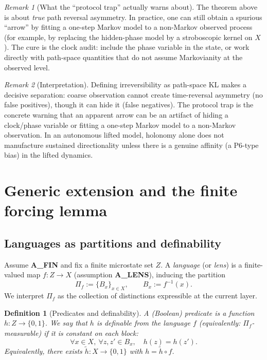 \documentclass[11pt]{article}
\newtheorem{definition}{Definition}
\theoremstyle{remark}
\newtheorem{remark}{Remark}
\begin{document}
\begin{remark}[What the ``protocol trap'' actually warns about]
The theorem above is about \emph{true} path reversal asymmetry.
In practice, one can still obtain a spurious ``arrow'' by fitting a one-step Markov model to a non-Markov observed process (for example, by replacing the hidden-phase model by a stroboscopic kernel on $X$).
The cure is the clock audit: include the phase variable in the state, or work directly with path-space quantities that do not assume Markovianity at the observed level.
\end{remark}

\begin{remark}[Interpretation]
Defining irreversibility as path-space KL makes a decisive separation: coarse observation cannot create time-reversal asymmetry (no false positives), though it can hide it (false negatives).
The protocol trap is the concrete warning that an apparent arrow can be an artifact of hiding a clock/phase variable or fitting a one-step Markov model to a non-Markov observation.
In an autonomous lifted model, holonomy alone does not manufacture sustained directionality unless there is a genuine affinity (a P6-type bias) in the lifted dynamics.
\end{remark}

\section{Generic extension and the finite forcing lemma}\label{sec:forcing}
\subsection{Languages as partitions and definability}

Assume \textbf{A\_FIN} and fix a finite microstate set $Z$.
A \emph{language} (or \emph{lens}) is a finite-valued map $f:Z\to X$ (assumption \textbf{A\_LENS}), inducing the partition
\[
\Pi_f := \{B_x\}_{x\in X}, \qquad B_x := f^{-1}(x).
\]
We interpret $\Pi_f$ as the collection of distinctions expressible at the current layer.

\begin{definition}[Predicates and definability]
A (Boolean) \emph{predicate} is a function $h:Z\to\{0,1\}$.
We say that $h$ is \emph{definable from the language $f$} (equivalently: $\Pi_f$-measurable) if it is constant on each block:
\[
\forall x\in X,\ \forall z,z'\in B_x,\quad h(z)=h(z').
\]
Equivalently, there exists $\tilde h:X\to\{0,1\}$ with $h=\tilde h\circ f$.
\end{definition}
\end{document}
